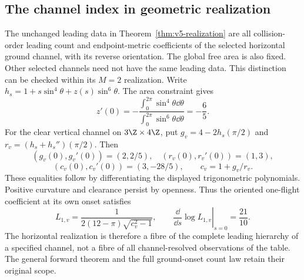 \subsection{The channel index in geometric realization}
The unchanged leading data in Theorem~\ref{thm:v5-realization} are all
collision-order leading count and endpoint-metric coefficients of the
selected horizontal ground channel, with its reverse orientation.
The global free area is also fixed. Other selected channels need not
have the same leading data. This distinction can be checked within its
$M=2$ realization. Write
$h_s=1+s\sin^4\theta+z(s)\sin^6\theta$. The area constraint gives
\[
 z'(0)=-\frac{\int_0^{2\pi}\sin^4\theta\dd\theta}
              {\int_0^{2\pi}\sin^6\theta\dd\theta}=-\frac65.
\]
For the clear vertical channel on $3\Z\times4\Z$, put
$g_v=4-2h_s(\pi/2)$ and $r_v=(h_s+h_s'')(\pi/2)$.
Then
\[
 (g_v(0),g_v'(0))=(2,2/5),\quad
 (r_v(0),r_v'(0))=(1,3),
\]
\[
 (c_v(0),c_v'(0))=(3,-28/5),\qquad c_v=1+g_v/r_v.
\]
These equalities follow by differentiating the displayed trigonometric
polynomials. Positive curvature and clearance persist by openness.
Thus the oriented one-flight coefficient at its own onset satisfies
\[
 L_{1,v}=\frac1{2(12-\pi)\sqrt{c_v^2-1}},\qquad
 \left.\frac{\dd}{\dd s}\log L_{1,v}\right|_{s=0}=\frac{21}{10}.
\]
The horizontal realization is therefore a fibre of the complete leading
hierarchy of a specified channel, not a fibre of all channel-resolved
observations of the table. The general forward theorem and the full
ground-onset count law retain their original scope.
